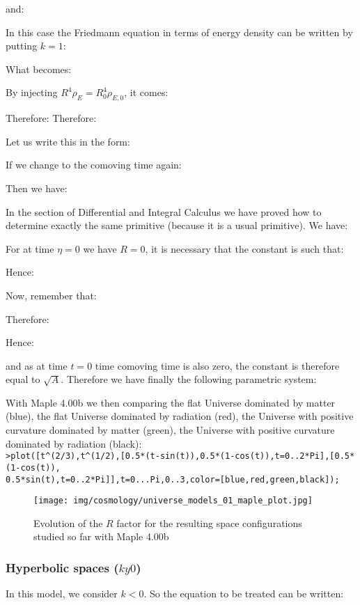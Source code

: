 	and:
	
	In this case the Friedmann equation in terms of energy density can be written by putting $k=1$:
	
	What becomes:
	
	By injecting $R^4\rho_E=R_0^4\rho_{E,0}$, it comes:
	
	Therefore:
	Therefore:
	
	Let us write this in the form:
		
	If we change to the comoving time again:
	
	Then we have:
		
	In the section of Differential and Integral Calculus we have proved how to determine exactly the same primitive (because it is a usual primitive). We have:
	
	For at time $\eta=0$ we have $R=0$, it is necessary that the constant is such that:
	
	Hence:
	
	Now, remember that:
	
	Therefore:
	
	Hence:
	
	and as at time $t=0$ time comoving time is also zero, the constant is therefore equal to $\sqrt{A}$. Therefore we have finally the following parametric system:
	
	With Maple 4.00b we then comparing the flat Universe dominated by matter (blue), the flat Universe dominated by radiation (red), the Universe with positive curvature dominated by matter (green), the Universe with positive curvature dominated by radiation (black):\\
	
	\texttt{>plot([t\string^(2/3),t\string^(1/2),[0.5*(t-sin(t)),0.5*(1-cos(t)),t=0..2*Pi],[0.5*(1-cos(t)),\\0.5*sin(t),t=0..2*Pi]],t=0...Pi,0..3,color=[blue,red,green,black]);}
	\begin{figure}[H]
		\centering
		\texttt{[image: img/cosmology/universe\_models\_01\_maple\_plot.jpg]}
		\caption[]{Evolution of the $R$ factor for the resulting space configurations studied so far with Maple 4.00b}
	\end{figure}
	
	\subsubsection{Hyperbolic spaces ($ky0$)}
	In this model, we consider $k<0$. So the equation to be treated can be written:
	
